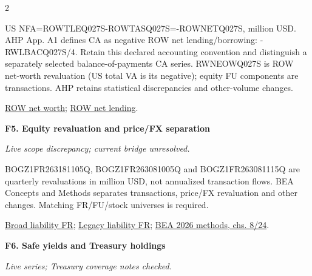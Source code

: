 \documentclass[10pt,a4paper,landscape]{article}
\begin{document}
\begin{multicols}{2}
\begin{minipage}{\linewidth}
US NFA=ROWTLEQ027S-ROWTASQ027S=-ROWNETQ027S, million USD. AHP App. A1 defines CA as negative ROW net lending/borrowing: -RWLBACQ027S/4. Retain this declared accounting convention and distinguish a separately selected balance-of-payments CA series. RWNEOWQ027S is ROW net-worth revaluation (US total VA is its negative); equity FU components are transactions. AHP retains statistical discrepancies and other-volume changes.

\par \href{https://fred.stlouisfed.org/series/ROWNETQ027S}{ROW net worth}; \href{https://fred.stlouisfed.org/series/RWLBACQ027S}{ROW net lending}.

\end{minipage}\par\vspace{6pt}

\noindent\begin{minipage}{\linewidth}\raggedright

\hypertarget{src-F5}{\textbf{F5. Equity revaluation and price/FX separation}}\par

{\footnotesize\itshape Live scope discrepancy; current bridge unresolved.}\par

BOGZ1FR263181105Q, BOGZ1FR263081005Q and BOGZ1FR263081115Q are quarterly revaluations in million USD, not annualized transaction flows. BEA Concepts and Methods separates transactions, price/FX revaluation and other changes. Matching FR/FU/stock universes is required.

\par \href{https://fred.stlouisfed.org/series/BOGZ1FR263081005Q}{Broad liability FR}; \href{https://fred.stlouisfed.org/series/BOGZ1FR263081115Q}{Legacy liability FR}; \href{https://www.bea.gov/sites/default/files/2026-06/BEA-International-Economic-Accounts-Concepts-and-Methods.pdf}{BEA 2026 methods, chs. 8/24}.

\end{minipage}\par\vspace{6pt}

\noindent\begin{minipage}{\linewidth}\raggedright

\hypertarget{src-F6}{\textbf{F6. Safe yields and Treasury holdings}}\par

{\footnotesize\itshape Live series; Treasury coverage notes checked.}\par


\end{minipage}
\end{multicols}
\end{document}
